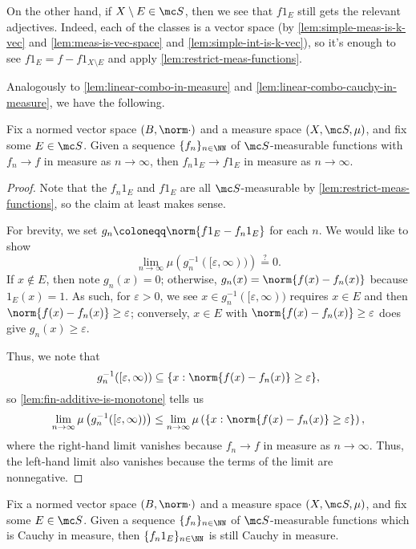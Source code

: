 \documentclass[../notes.tex]{subfiles}
\begin{document}
\begin{remark} \label{rem:complement-restrict-meas-functions}
	On the other hand, if $X\setminus E\in\mc S$, then we see that $f1_E$ still gets the relevant adjectives. Indeed, each of the classes is a vector space (by \autoref{lem:simple-meas-is-k-vec} and \autoref{lem:meas-is-vec-space} and \autoref{lem:simple-int-is-k-vec}), so it's enough to see $f1_E=f-f1_{X\setminus E}$ and apply \autoref{lem:restrict-meas-functions}.
\end{remark}
Analogously to \autoref{lem:linear-combo-in-measure} and \autoref{lem:linear-combo-cauchy-in-measure}, we have the following.
\begin{lemma} \label{lem:restrict-converge-in-measure}
	Fix a normed vector space $(B,\norm\cdot)$ and a measure space $(X,\mc S,\mu)$, and fix some $E\in\mc S$. Given a sequence $\{f_n\}_{n\in\NN}$ of $\mc S$-measurable functions with $f_n\to f$ in measure as $n\to\infty$, then $f_n1_E\to f1_E$ in measure as $n\to\infty$.
\end{lemma}
\begin{proof}
	Note that the $f_n1_E$ and $f1_E$ are all $\mc S$-measurable by \autoref{lem:restrict-meas-functions}, so the claim at least makes sense.

	For brevity, we set $g_n\coloneqq\norm{f1_E-f_n1_E}$ for each $n$. We would like to show
	\[\lim_{n\to\infty}\mu\left(g_n^{-1}([\varepsilon,\infty))\right)\stackrel?=0.\]
	If $x\notin E$, then note $g_n(x)=0$; otherwise, $g_n(x)=\norm{f(x)-f_n(x)}$ because $1_E(x)=1$. As such, for $\varepsilon>0$, we see $x\in g_n^{-1}([\varepsilon,\infty))$ requires $x\in E$ and then $\norm{f(x)-f_n(x)}\ge\varepsilon$; conversely, $x\in E$ with $\norm{f(x)-f_n(x)}\ge\varepsilon$ does give $g_n(x)\ge\varepsilon$.

	Thus, we note that
	\[g_n^{-1}([\varepsilon,\infty))\subseteq\{x:\norm{f(x)-f_n(x)}\ge\varepsilon\},\]
	so \autoref{lem:fin-additive-is-monotone} tells us
	\[\lim_{n\to\infty}\mu\left(g_n^{-1}([\varepsilon,\infty))\right)\le\lim_{n\to\infty}\mu\left(\{x:\norm{f(x)-f_n(x)}\ge\varepsilon\}\right),\]
	where the right-hand limit vanishes because $f_n\to f$ in measure as $n\to\infty$. Thus, the left-hand limit also vanishes because the terms of the limit are nonnegative.
\end{proof}
\begin{lemma}
	Fix a normed vector space $(B,\norm\cdot)$ and a measure space $(X,\mc S,\mu)$, and fix some $E\in\mc S$. Given a sequence $\{f_n\}_{n\in\NN}$ of $\mc S$-measurable functions which is Cauchy in measure, then $\{f_n1_E\}_{n\in\NN}$ is still Cauchy in measure.
\end{lemma}
\end{document}
